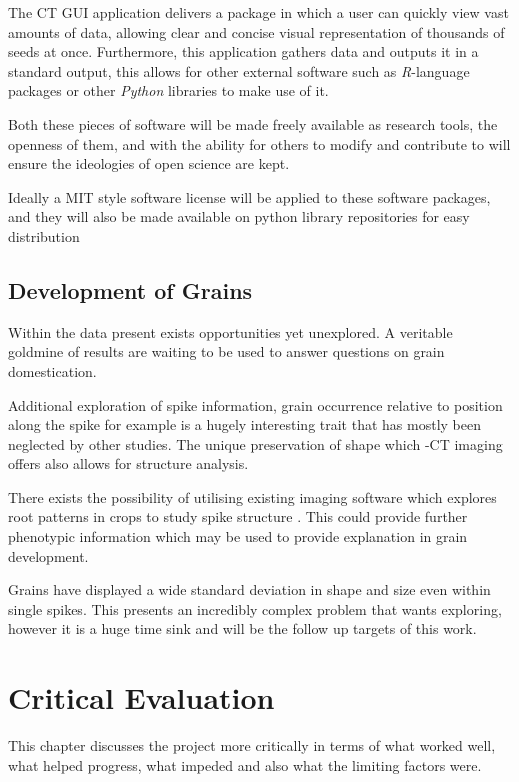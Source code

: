 \documentclass[11pt]{report}
\begin{document}
The CT GUI application delivers a package in which a user can quickly view vast amounts of data, allowing clear and concise visual representation of thousands of seeds at once. Furthermore, this application gathers data and outputs it in a standard output, this allows for other external software such as \emph{R}-language packages or other \emph{Python} libraries to make use of it.

Both these pieces of software will be made freely available as research tools, the openness of them, and with the ability for others to modify and contribute to will ensure the ideologies of open science are kept.

Ideally a MIT style software license will be applied to these software packages, and they will also be made available on python library repositories for easy distribution

\section{Development of Grains}
\label{sec:org46ab390}
Within the data present exists opportunities yet unexplored. A veritable goldmine of results are waiting to be used to answer questions on grain domestication.

Additional exploration of spike information, grain occurrence relative to position along the spike for example is a hugely interesting trait that has mostly been neglected by other studies. The unique preservation of shape which \textmu{}-CT imaging offers also allows for structure analysis.

There exists the possibility of utilising existing imaging software which explores root patterns in crops to study spike structure \cite{Mairhofer2015,Daly2017}. This could provide further phenotypic information which may be used to provide explanation in grain development.

Grains have displayed a wide standard deviation in shape and size even within single spikes. This presents an incredibly complex problem that wants exploring, however it is a huge time sink and will be the follow up targets of this work.

\chapter{Critical Evaluation}
\label{sec:org757bf20}
This chapter discusses the project more critically in terms of what worked well, what helped progress, what impeded and also what the limiting factors were.
\end{document}

